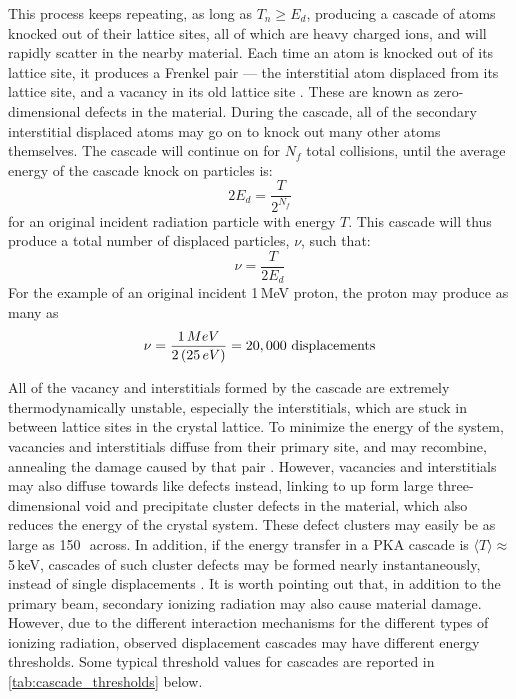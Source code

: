 This process keeps repeating, as long as $T_n \ge E_d$, producing a cascade of  atoms knocked out of their lattice sites, all of which are heavy charged ions, and will rapidly scatter in the nearby material. 
Each time an atom is knocked out of its lattice site, it produces a Frenkel pair --- the interstitial atom displaced from its lattice site, and a vacancy in its old lattice site \cite{olander1990fundamental,Pehl1978}. 
These are known as zero-dimensional defects in the material. 
During the cascade, all of the secondary interstitial displaced atoms may go on to knock out many other atoms themselves.
The cascade will continue on for $N_f$ total collisions, until the average energy of the cascade knock on particles is:
\begin{equation}
2E_d = \dfrac{T}{2^{N_f}}
\end{equation}
for an original incident radiation particle with energy $T$. 
This cascade will thus produce a total number of displaced particles, $\nu$, such that:
\begin{equation}
\nu = \dfrac{T}{2E_d}
\end{equation}
For the example of an original incident 1\,MeV proton, the proton may produce as many as
\begin{equation}
\nu = \dfrac{1\,MeV}{2\left( 25\,eV\right)} = 20,000\text{ displacements}
\end{equation}

All of the vacancy and interstitials formed by the cascade are extremely thermodynamically unstable, especially the interstitials, which are stuck in between lattice sites in the crystal lattice. 
To minimize the energy of the system, vacancies and interstitials diffuse from their primary site, and may recombine, annealing the damage caused by that pair \cite{shackelford2009introduction}. 
However, vacancies and interstitials may also diffuse towards like defects instead, linking to up form large three-dimensional void and precipitate cluster defects in the material, which also reduces the energy of the crystal system.
These defect clusters may easily be as large as 150\,\angstrom\ across. 
In addition, if the energy transfer in a PKA cascade is $\langle T \rangle \approx$ 5\,keV, cascades of such cluster defects may be formed nearly instantaneously, instead of single displacements \cite{Moll2000,Fourches2012a}.
It is worth pointing out that, in addition to the primary beam, secondary ionizing radiation may also cause material damage. 
However, due to the different interaction mechanisms for the different types of ionizing radiation, observed displacement cascades may have different energy thresholds.
Some typical threshold values for cascades are reported in \autoref{tab:cascade_thresholds} below.


